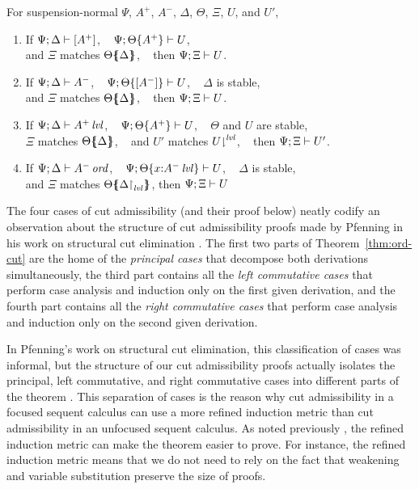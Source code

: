 \bigskip
\begin{theorem}\label{thm:ord-cut}
For suspension-normal $\Psi$, $A^+$, $A^-$, $\Delta$, $\Theta$, $\Xi$, $U$, and $U'$,
\begin{enumerate}
\item If ${\Psi};{\Delta} \vdash {[ A^+ ]}$, ~
         ${\Psi};{{\Theta}\{{A^+}\}} \vdash {U}$,\\
      and $\Xi$ matches ${\Theta}\mbox{$\{\hspace{-4pt}\{$}{{\Delta}}\mbox{$\}\hspace{-4pt}\}$}$, ~
      then ${\Psi};{\Xi} \vdash {U}$.
\item If ${\Psi};{\Delta} \vdash {A^-}$, ~
         ${\Psi};{{\Theta}\{{[A^-]}\}} \vdash {U}$, ~
         $\Delta$ is stable, \\
      and $\Xi$ matches ${\Theta}\mbox{$\{\hspace{-4pt}\{$}{\Delta}\mbox{$\}\hspace{-4pt}\}$}$, ~
      then ${\Psi};{\Xi} \vdash {U}$.
\item If ${\Psi};{\Delta} \vdash {{A^+}\,{{\it lvl}}}$, ~
         ${\Psi};{{\Theta}\{{A^+}\}} \vdash {U}$, ~
         $\Theta$ and $U$ are stable, \\ 
      $\Xi$ matches ${\Theta}\mbox{$\{\hspace{-4pt}\{$}{\Delta}\mbox{$\}\hspace{-4pt}\}$}$, ~
      and $U'$ matches ${U}{\downharpoonright}^{{\it lvl}}$, ~
      then ${\Psi};{\Xi} \vdash {U'}$.
\item If ${\Psi};{\Delta} \vdash {{A^-}\,{{\it ord}}}$, ~
         ${\Psi};{{\Theta}\{{x{:}{A^-}\,{{\it lvl}}}\}} \vdash {U}$, ~
         $\Delta$ is stable, \\ 
      and $\Xi$ matches ${\Theta}\mbox{$\{\hspace{-4pt}\{$}{\ensuremath{{\Delta}{\upharpoonright}_{{\it lvl}}}}\mbox{$\}\hspace{-4pt}\}$}$,
      then ${\Psi};{\Xi} \vdash {U}$
\end{enumerate}
\end{theorem}
\bigskip

\noindent
The four cases of cut admissibility (and their proof below) neatly
codify an observation about the structure of cut admissibility proofs
made by Pfenning in his work on structural cut elimination
\cite{pfenning00structural}.  The first two parts of
Theorem~\ref{thm:ord-cut} are the home of the {\it principal cases}
that decompose both derivations simultaneously, the third part
contains all the {\it left commutative cases} that perform case
analysis and induction only on the first given derivation, and the
fourth part contains all the {\it right commutative cases} that
perform case analysis and induction only on the second given
derivation.

In Pfenning's work on structural cut elimination, this classification
of cases was informal, but the structure of our cut admissibility
proofs actually isolates the principal, left commutative, and right
commutative cases into different parts of the theorem
\cite{pfenning00structural}. This separation of cases is the reason
why cut admissibility in a focused sequent calculus can use a more
refined induction metric than cut admissibility in an unfocused
sequent calculus. As noted previously \cite{simmons11structural}, the
refined induction metric can make the theorem easier to prove.  For
instance, the refined induction metric means that we do not need to
rely on the fact that weakening and variable substitution preserve
the size of proofs.

